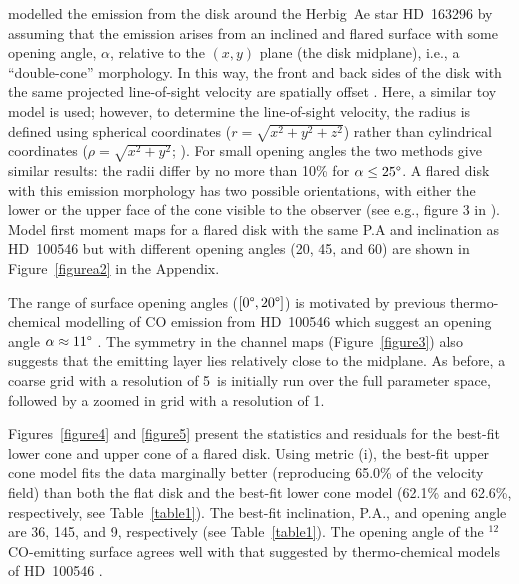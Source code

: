 \documentclass[onecolumn]{aastex6}
\begin{document}
\citet{rosenfeld13} modelled the emission from the disk around  the Herbig~Ae
star HD~163296 by assuming that the emission arises from  an inclined and flared
surface with some opening angle, $\alpha$, relative  to the $(x,y)$ plane (the
disk midplane), i.e., a ``double-cone'' morphology.     In this way, the front
and back sides of the disk with the same projected  line-of-sight velocity are
spatially offset \citep[see also][]{degregorio13}.   Here, a similar toy model
is used; however, to determine the  line-of-sight velocity, the radius is
defined using spherical coordinates ($r=\sqrt{x^2+y^2+z^2}$) rather than 
cylindrical coordinates  ($\rho=\sqrt{x^2+y^2}$; \citealt{rosenfeld13}).   For
small opening angles the two methods give similar results:  the radii differ by
no more than 10\% for $\alpha \le 25\degree$.   A flared disk with this emission
morphology has two possible orientations, with either the lower or the upper
face of the cone visible to the observer (see e.g., figure 3 in
\citealt{rosenfeld13}).   Model first moment maps for a flared disk with the
same P.A and inclination as  HD~100546 but with different opening angles
(20\degree, 45\degree, and  60\degree) are shown in Figure~\ref{figurea2} in the
Appendix.  

The range of surface opening angles ($[0\degree,20\degree]$) is motivated by
previous thermo-chemical  modelling of CO emission from HD~100546  which suggest
an opening angle $\alpha \approx 11\degree$ \citep[][]{bruderer12}.   The
symmetry in the channel maps (Figure~\ref{figure3}) also suggests that the
emitting layer  lies relatively close to the midplane.   As before, a coarse
grid with a resolution of 5\degree~is initially  run over the full parameter
space, followed by a zoomed in grid  with a resolution of 1\degree.

Figures~\ref{figure4} and \ref{figure5} present the statistics and residuals 
for the best-fit lower cone and upper cone of a flared disk.  
Using metric (i), the best-fit upper cone model fits the data marginally better 
(reproducing 65.0\% of the velocity field) than both the flat disk and the best-fit lower 
cone model (62.1\% and 62.6\%, respectively, see Table~\ref{table1}).  
The best-fit inclination, P.A., and opening angle are 36\degree, 
145\degree, and 9\degree, respectively (see Table~\ref{table1}).  
The opening angle of the $^{12}$CO-emitting surface agrees well with that 
suggested by thermo-chemical models of HD~100546 \citep{bruderer12}.
\end{document}
